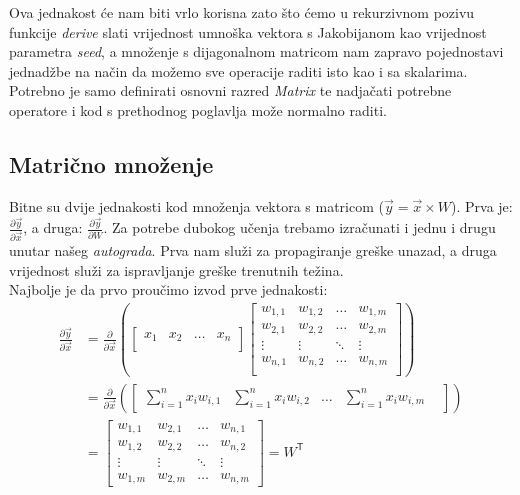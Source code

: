\documentclass[zavrsnirad]{fer}
\begin{document}
Ova jednakost će nam biti vrlo korisna zato što ćemo u rekurzivnom pozivu funkcije \textit{derive} slati vrijednost umnoška vektora s Jakobijanom kao vrijednost parametra \textit{seed}, a množenje s dijagonalnom matricom nam zapravo pojednostavi jednadžbe na način da možemo sve operacije raditi isto kao i sa skalarima. Potrebno je samo definirati osnovni razred \textit{Matrix} te nadjačati potrebne operatore i kod s prethodnog poglavlja može normalno raditi.



\subsection{Matrično množenje}
Bitne su dvije jednakosti kod množenja vektora s matricom ($\vec{y} = \vec{x} \times W$). Prva je: $\frac{\partial \vec{y}}{\partial \vec{x}}$, a druga: $\frac{\partial \vec{y}}{\partial W}$. Za potrebe dubokog učenja trebamo izračunati i jednu i drugu unutar našeg \textit{autograda}. Prva nam služi za propagiranje greške unazad, a druga vrijednost služi za ispravljanje greške trenutnih težina.
\cite{backprop:michigan}
\\
Najbolje je da prvo proučimo izvod prve jednakosti:
\begin{align*}
  \frac{\partial \vec{y}}{\partial \vec{x}} &=
  \frac{\partial}{\partial \vec{x}}
  \left(
  \begin{bmatrix}
    x_1 & x_2 & \dots & x_n \\
  \end{bmatrix}
  \begin{bmatrix}
    w_{1,1} & w_{1,2} & \dots & w_{1,m} \\
    w_{2,1} & w_{2,2} & \dots & w_{2,m} \\
    \vdots & \vdots & \ddots & \vdots \\
    w_{n,1} & w_{n,2} & \dots & w_{n,m} \\
  \end{bmatrix}
  \right)\\
  &=
  \frac{\partial}{\partial \vec{x}}
  \left(
  \begin{bmatrix}
    \sum_{i=1}^{n} x_i w_{i,1} &
    \sum_{i=1}^{n} x_i w_{i,2} &
    \dots &
    \sum_{i=1}^{n} x_i w_{i,m} &
  \end{bmatrix}
  \right)\\
  &=
  \begin{bmatrix}
    w_{1,1} & w_{2,1} & \dots & w_{n,1} \\
    w_{1,2} & w_{2,2} & \dots & w_{n,2} \\
    \vdots & \vdots & \ddots & \vdots \\
    w_{1,m} & w_{2,m} & \dots & w_{n,m}
  \end{bmatrix}
    = W^\mathsf{T}
\end{align*}
\end{document}

